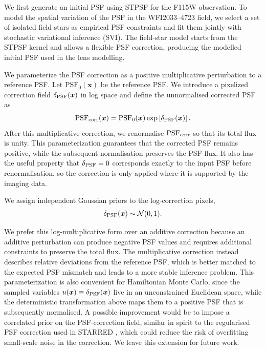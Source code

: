 \documentclass[fleqn,usenatbib]{mnras}
\begin{document}
We first generate an initial PSF using \textsc{STPSF} for the F115W observation. To model the spatial variation of the PSF in the WFI2033--4723 field, we select a set of isolated field stars as empirical PSF constraints and fit them jointly with stochastic variational inference (SVI). The field-star model starts from the \textsc{STPSF} kernel and allows a flexible PSF correction, producing the modelled initial PSF used in the lens modelling.

We parameterize the PSF correction as a positive multiplicative perturbation to a reference PSF. Let \(\mathrm{PSF}_0(\boldsymbol{x})\) be the reference PSF. We introduce a pixelized correction field \(\delta_{\rm PSF}(\boldsymbol{x})\) in log space and define the unnormalised corrected PSF as
\[
\mathrm{PSF}_{\rm corr}(\boldsymbol{x})
=
\mathrm{PSF}_0(\boldsymbol{x}) \exp\left[\delta_{\rm PSF}(\boldsymbol{x})\right].
\]
After this multiplicative correction, we renormalise \(\mathrm{PSF}_{\rm corr}\) so that its total flux is unity. This parameterization guarantees that the corrected PSF remains positive, while the subsequent normalisation preserves the PSF flux. It also has the useful property that \(\delta_{\rm PSF}=0\) corresponds exactly to the input PSF before renormalisation, so the correction is only applied where it is supported by the imaging data.

We assign independent Gaussian priors to the log-correction pixels,
\[
\delta_{\rm PSF}(\boldsymbol{x}) \sim \mathcal{N}(0,1).
\]

We prefer this log-multiplicative form over an additive correction because an additive perturbation can produce negative PSF values and requires additional constraints to preserve the total flux. The multiplicative correction instead describes relative deviations from the reference PSF, which is better matched to the expected PSF mismatch and leads to a more stable inference problem. This parameterization is also convenient for Hamiltonian Monte Carlo, since the sampled variables \(u(\boldsymbol{x}) \equiv \delta_{\rm PSF}(\boldsymbol{x})\) live in an unconstrained Euclidean space, while the deterministic transformation above maps them to a positive PSF that is subsequently normalised. A possible improvement would be to impose a correlated prior on the PSF-correction field, similar in spirit to the regularised PSF correction used in \textsc{STARRED} \citep{michalewicz2023,millon2024}, which could reduce the risk of overfitting small-scale noise in the correction. We leave this extension for future work.
\end{document}

